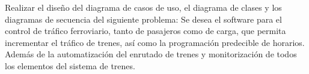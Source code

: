 Realizar el diseño del diagrama de casos de uso, el diagrama de clases y los diagramas de secuencia del siguiente problema: Se desea el software para el control de tráfico ferroviario, tanto de pasajeros como de carga, que permita incrementar el tráfico de trenes, así como la programación predecible de horarios. Además de la automatización del enrutado de trenes y monitorización de todos los elementos del sistema de trenes.
